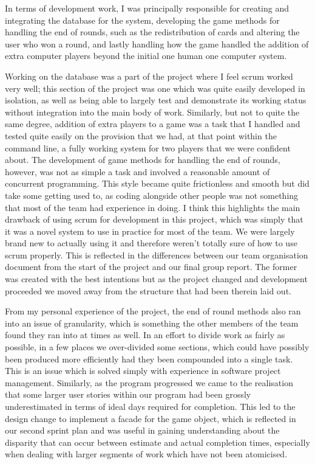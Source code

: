 \documentclass[12pt]{article}
\begin{document}
In terms of development work, I was principally responsible for creating and integrating the database for the system, developing the game methods for handling the end of rounds, such as the redistribution of cards and altering the user who won a round, and lastly handling how the game handled the addition of extra computer players beyond the initial one human one computer system.

Working on the database was a part of the project where I feel scrum worked very well; this section of the project was one which was quite easily developed in isolation, as well as being able to largely test and demonstrate its working status without integration into the main body of work. Similarly, but not to quite the same degree, addition of extra players to a game was a task that I handled and tested quite easily on the provision that we had, at that point within the command line, a fully working system for two players that we were confident about. The development of game methods for handling the end of rounds, however, was not as simple a task and involved a reasonable amount of concurrent programming. This style became quite frictionless and smooth but did take some getting used to, as coding alongside other people was not something that most of the team had experience in doing. I think this highlights the main drawback of using scrum for development in this project, which was simply that it was a novel system to use in practice for most of the team. We were largely brand new to actually using it and therefore weren't totally sure of how to use scrum properly. This is reflected in the differences between our team organisation document from the start of the project and our final group report. The former was created with the best intentions but as the project changed and development proceeded we moved away from the structure that had been therein laid out.

From my personal experience of the project, the end of round methods also ran into an issue of granularity, which is something the other members of the team found they ran into at times as well. In an effort to divide work as fairly as possible, in a few places we over-divided some sections, which could have possibly been produced more efficiently had they been compounded into a single task. This is an issue which is solved simply with experience in software project management. Similarly, as the program progressed we came to the realisation that some larger user stories within our program had been grossly underestimated in terms of ideal days required for completion. This led to the design change to implement a facade for the game object, which is reflected in our second sprint plan and was useful in gaining understanding about the disparity that can occur between estimate and actual completion times, especially when dealing with larger segments of work which have not been atomicised.
\end{document}
